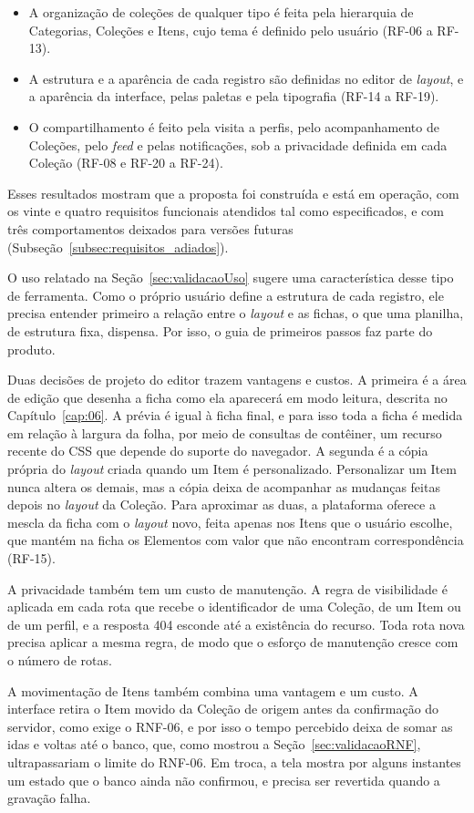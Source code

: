 \begin{itemize}
    \item A organização de coleções de qualquer tipo é feita pela hierarquia de Categorias, Coleções e Itens, cujo tema é definido pelo usuário (RF-06 a RF-13).
    \item A estrutura e a aparência de cada registro são definidas no editor de \textit{layout}, e a aparência da interface, pelas paletas e pela tipografia
    (RF-14 a RF-19).
    \item O compartilhamento é feito pela visita a perfis, pelo acompanhamento de Coleções, pelo \textit{feed} e pelas notificações, sob a privacidade
    definida em cada Coleção (RF-08 e RF-20 a RF-24).
\end{itemize}

Esses resultados mostram que a proposta foi construída e está em operação, com os vinte e quatro requisitos funcionais atendidos tal como especificados,
e com três comportamentos deixados para versões futuras (Subseção~\ref{subsec:requisitos_adiados}).

O uso relatado na Seção~\ref{sec:validacaoUso} sugere uma característica desse tipo de ferramenta. Como o próprio usuário define a estrutura de cada registro,
ele precisa entender primeiro a relação entre o \textit{layout} e as fichas, o que uma planilha, de estrutura fixa, dispensa. Por isso, o guia de primeiros
passos faz parte do produto.

Duas decisões de projeto do editor trazem vantagens e custos. A primeira é a área de edição que desenha a ficha como ela aparecerá em modo leitura, descrita
no Capítulo~\ref{cap:06}. A prévia é igual à ficha final, e para isso toda a ficha é medida em relação à largura da folha, por meio de consultas de contêiner,
um recurso recente do CSS que depende do suporte do navegador. A segunda é a cópia própria do \textit{layout} criada quando um Item é personalizado.
Personalizar um Item nunca altera os demais, mas a cópia deixa de acompanhar as mudanças feitas depois no \textit{layout} da Coleção. Para aproximar as duas,
a plataforma oferece a mescla da ficha com o \textit{layout} novo, feita apenas nos Itens que o usuário escolhe, que mantém na ficha os Elementos com valor
que não encontram correspondência (RF-15).

A privacidade também tem um custo de manutenção. A regra de visibilidade é aplicada em cada rota que recebe o identificador de uma Coleção, de um Item
ou de um perfil, e a resposta 404 esconde até a existência do recurso. Toda rota nova precisa aplicar a mesma regra, de modo que o esforço de manutenção
cresce com o número de rotas.

A movimentação de Itens também combina uma vantagem e um custo. A interface retira o Item movido da Coleção de origem antes da confirmação do servidor,
como exige o RNF-06, e por isso o tempo percebido deixa de somar as idas e voltas até o banco, que, como mostrou a Seção~\ref{sec:validacaoRNF}, ultrapassariam o limite do
RNF-06. Em troca, a tela mostra por alguns instantes um estado que o banco ainda não confirmou, e precisa ser revertida quando a gravação falha.

